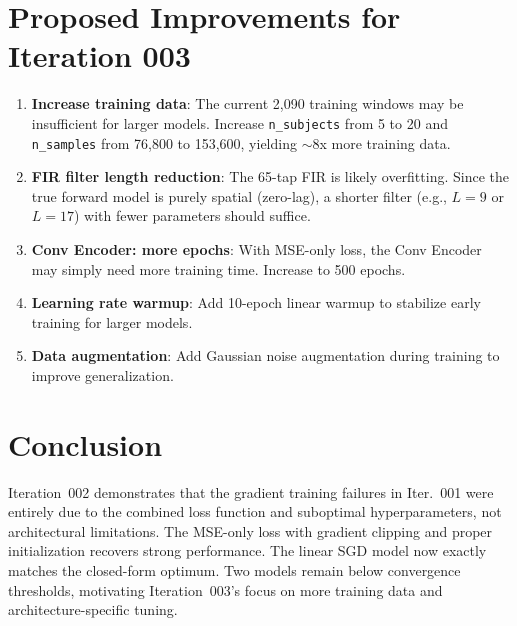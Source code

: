 \documentclass[11pt,a4paper]{article}
\begin{document}
\section{Proposed Improvements for Iteration 003}

\begin{enumerate}
  \item \textbf{Increase training data}: The current 2,090 training windows
    may be insufficient for larger models. Increase \texttt{n\_subjects} from
    5 to 20 and \texttt{n\_samples} from 76,800 to 153,600, yielding $\sim$8x
    more training data.

  \item \textbf{FIR filter length reduction}: The 65-tap FIR is likely overfitting.
    Since the true forward model is purely spatial (zero-lag), a shorter filter
    (e.g., $L=9$ or $L=17$) with fewer parameters should suffice.

  \item \textbf{Conv Encoder: more epochs}: With MSE-only loss, the Conv Encoder
    may simply need more training time. Increase to 500 epochs.

  \item \textbf{Learning rate warmup}: Add 10-epoch linear warmup to stabilize
    early training for larger models.

  \item \textbf{Data augmentation}: Add Gaussian noise augmentation during
    training to improve generalization.
\end{enumerate}

\section{Conclusion}

Iteration~002 demonstrates that the gradient training failures in Iter.~001
were entirely due to the combined loss function and suboptimal hyperparameters,
not architectural limitations. The MSE-only loss with gradient clipping and
proper initialization recovers strong performance. The linear SGD model now
exactly matches the closed-form optimum. Two models remain below convergence
thresholds, motivating Iteration~003's focus on more training data and
architecture-specific tuning.
\end{document}
